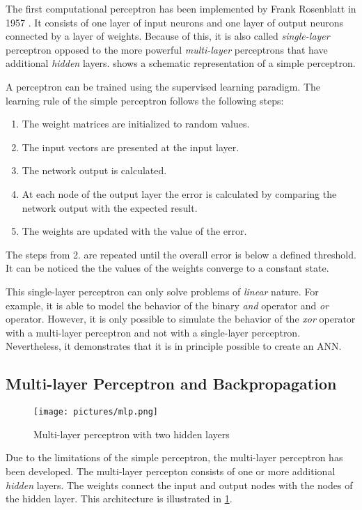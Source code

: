 The first computational perceptron has been implemented by Frank Rosenblatt in 1957 \cite{Rosenblatt_1957}.  It consists of one layer of input neurons and one layer of output neurons connected by a layer of weights. Because of this, it is also called \textit{single-layer} perceptron opposed to the more powerful \textit{multi-layer} perceptrons that have additional \textit{hidden} layers.  shows a schematic representation of a simple perceptron.

A perceptron can be trained using the supervised learning paradigm. The learning rule of the simple perceptron follows the following steps:

\begin{enumerate}
    \item The weight matrices are initialized to random values.
    \item The input vectors are presented at the input layer.
    \item The network output is calculated.
    \item At each node of the output layer the error is calculated by comparing the network output with the expected result.
    \item The weights are updated with the value of the error.
\end{enumerate}

The steps from 2. are repeated until the overall error is below a defined threshold. It can be noticed the the values of the weights converge to a constant state.
\cite{haykin2009neural,Rosenblatt_1957}

This single-layer perceptron can only solve problems of \textit{linear} nature. For example, it is able to model the behavior of the binary \textit{and} operator and \textit{or} operator. However, it is only possible to simulate the behavior of the \textit{xor} operator with a multi-layer perceptron and not with a single-layer perceptron. Nevertheless, it demonstrates that it is in principle possible to create an \ac{ANN}.
\cite{haykin2009neural}

\subsection*{Multi-layer Perceptron and Backpropagation}
\begin{figure}[ht]
    \centering 
    \texttt{[image: pictures/mlp.png]}
    \caption{Multi-layer perceptron with two hidden layers \cite{nielsen2015neural}}
    \label{pic:mlp}    %
\end{figure}
Due to the limitations of the simple perceptron, the multi-layer perceptron has been developed. The multi-layer percepton consists of one or more additional \textit{hidden} layers. The weights connect the input and output nodes with the nodes of the hidden layer. This architecture is illustrated in \cref{pic:mlp}.

